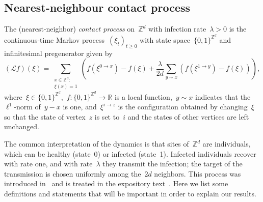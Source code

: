 \documentclass[a4paper,12pt]{article}
\begin{document}
\subsection{Nearest-neighbour contact process}\label{subsect_intro_near_neigh_cont_proc}
The (nearest-neighbor) \textit{contact process} on~$\mathbb{Z}^d$ with infection rate~$\lambda > 0$ is the continuous-time Markov process~$(\xi_t)_{t\geq 0}$ with state space~$\{0,1\}^{\mathbb{Z}^d}$ and infinitesimal pregenerator given by
\begin{equation}\label{eq:generator_nn}
(\mathcal{L}f)(\xi) = \sum_{\substack{x \in \mathbb{Z}^d:\\\xi(x) = 1}} \left( f(\xi^{0 \to x}) - f(\xi) + \frac{\lambda}{  2d}  \sum_{y
	\sim x} (f(\xi^{1 \to y}) - f(\xi))\right),
\end{equation}
where~$\xi \in \{0,1\}^{\mathbb{Z}^d}$,~$f: \{0,1\}^{\mathbb{Z}^d} \to \mathbb{R}$ is a local function,~$y \sim x$ indicates that the~$\ell^1$-norm of~$y-x$ is one,  and~$\xi^{i \to z}$ is the configuration obtained by changing~$\xi$ so that the state of vertex~$z$ is set to~$i$ and the states of other vertices are left unchanged. 

\smallskip

The common interpretation of the dynamics is that sites of~$\mathbb{Z}^d$ are individuals, which can be healthy (state~0) or infected (state~1). Infected individuals recover with rate one, and with rate~$\lambda$ they transmit the  infection; the target of the transmission is chosen uniformly among the~$2d$ neighbors. This process was introduced in~\cite{Har74} and is treated in the expository text~\cite{Li99}. Here we list some definitions and statements that will be important in order to explain our results.

\smallskip
\end{document}
